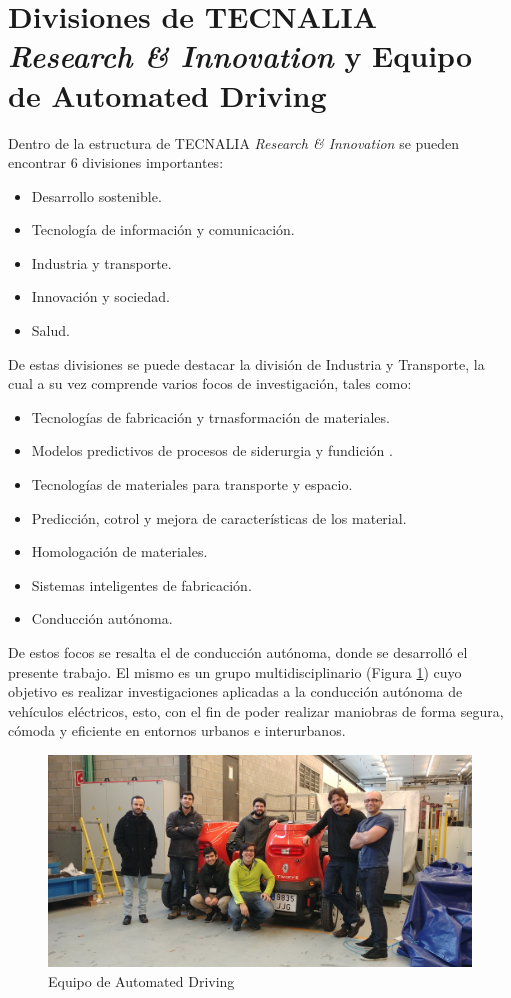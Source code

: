 \section{Divisiones de TECNALIA \textit{Research \& Innovation} y Equipo de Automated Driving}
Dentro de la estructura de TECNALIA \textit{Research \& Innovation} se pueden encontrar 6 divisiones importantes:
\begin{itemize}
	\item Desarrollo sostenible.
	\item Tecnología de información y comunicación.
	\item Industria y transporte.
	\item Innovación y sociedad.
	\item Salud.
\end{itemize}
\par De estas divisiones se puede destacar la división de Industria y Transporte, la cual a su vez comprende varios focos de investigación, tales como: 
\begin{itemize}
	\item Tecnologías de fabricación  y trnasformación de materiales.
	\item Modelos predictivos de procesos de siderurgia y fundición .
	\item Tecnologías de materiales para transporte y espacio.
	\item Predicción, cotrol y mejora de características de los material.
	\item Homologación de materiales.
	\item Sistemas inteligentes de fabricación.
	\item Conducción autónoma.
\end{itemize}
\par De estos focos se resalta el de conducción autónoma, donde se desarrolló el presente trabajo. El mismo es un grupo multidisciplinario (Figura \ref{fig:equipo}) cuyo objetivo es  realizar investigaciones aplicadas a la conducción autónoma de vehículos eléctricos, esto, con el fin de poder realizar maniobras de forma segura, cómoda y eficiente en entornos urbanos e interurbanos. 
\begin{figure}[!h]
	\centering
		\includegraphics[scale=0.08]{Imagenes/equipo}
		\caption{Equipo de Automated Driving}
		\label{fig:equipo}
	\end{figure}	  
